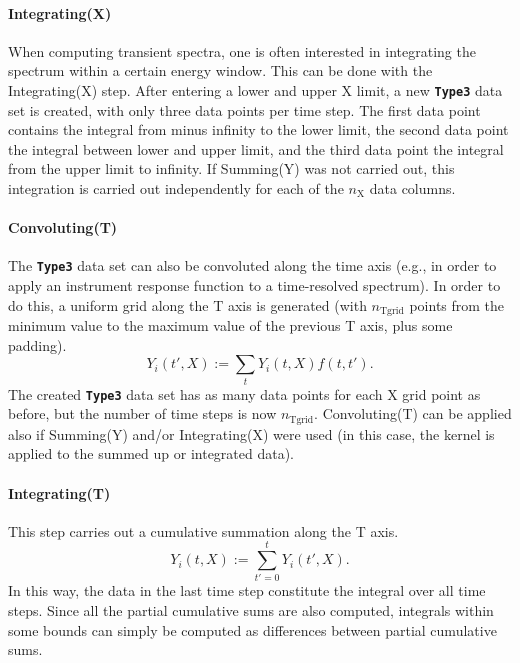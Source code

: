 \documentclass[a4paper,10pt,DIV=15,openany]{scrbook}
\newcommand{\ttt}[1]{\textbf{\texttt{#1}}}
\begin{document}
\paragraph{Integrating(X)}

When computing transient spectra, one is often interested in integrating the spectrum within a certain energy window.
This can be done with the Integrating(X) step.
After entering a lower and upper X limit, a new \ttt{Type3} data set is created, with only three data points per time step.
The first data point contains the integral from minus infinity to the lower limit, the second data point the integral between lower and upper limit, and the third data point the integral from the upper limit to infinity.
If Summing(Y) was not carried out, this integration is carried out independently for each of the $n_\text{X}$ data columns.

\paragraph{Convoluting(T)}

The \ttt{Type3} data set can also be convoluted along the time axis (e.g., in order to apply an instrument response function to a time-resolved spectrum).
In order to do this, a uniform grid along the T axis is generated (with $n_\text{Tgrid}$ points from the minimum value to the maximum value of the previous T axis, plus some padding).
\begin{equation}
  Y_i(t',X):=\sum_{t} Y_i(t,X) f(t,t').
\end{equation}
The created \ttt{Type3} data set has as many data points for each X grid point as before, but the number of time steps is now $n_\text{Tgrid}$.
Convoluting(T) can be applied also if Summing(Y) and/or Integrating(X) were used (in this case, the kernel is applied to the summed up or integrated data).

\paragraph{Integrating(T)}

This step carries out a cumulative summation along the T axis.
\begin{equation}
  Y_i(t,X):=\sum_{t'=0}^t Y_i(t',X).
\end{equation}
In this way, the data in the last time step constitute the integral over all time steps.
Since all the partial cumulative sums are also computed, integrals within some bounds can simply be computed as differences between partial cumulative sums.
\end{document}

